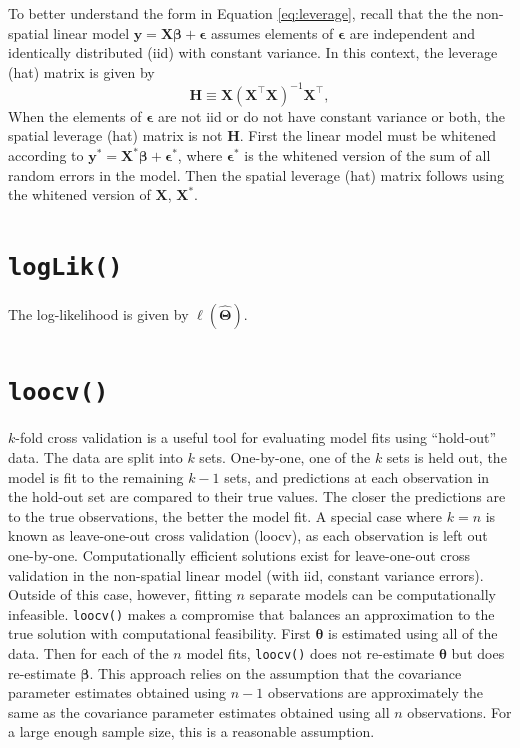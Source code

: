 \documentclass{article}
\begin{document}
To better understand the form in Equation \ref{eq:leverage}, recall that
the the non-spatial linear model
\(\mathbf{y} = \mathbf{X} \boldsymbol{\beta} + \boldsymbol{\epsilon}\)
assumes elements of \(\boldsymbol{\epsilon}\) are independent and
identically distributed (iid) with constant variance. In this context,
the leverage (hat) matrix is given by \begin{equation*}
\mathbf{H} \equiv \mathbf{X} (\mathbf{X}^{\top} \mathbf{X})^{-1} \mathbf{X}^{\top},
\end{equation*} When the elements of \(\boldsymbol{\epsilon}\) are not
iid or do not have constant variance or both, the spatial leverage (hat)
matrix is not \(\mathbf{H}\). First the linear model must be whitened
according to
\(\mathbf{y}^* = \mathbf{X}^* \boldsymbol{\beta} + \boldsymbol{\epsilon}^*\),
where \(\boldsymbol{\epsilon}^*\) is the whitened version of the sum of
all random errors in the model. Then the spatial leverage (hat) matrix
follows using the whitened version of \(\mathbf{X}\), \(\mathbf{X}^*\).

\hypertarget{sec:loglik}{%
\section{\texorpdfstring{\texttt{logLik()}}{logLik()}}\label{sec:loglik}}

The log-likelihood is given by \(\ell(\boldsymbol{\hat{\Theta}})\).

\hypertarget{sec:loocv}{%
\section{\texorpdfstring{\texttt{loocv()}}{loocv()}}\label{sec:loocv}}

\(k\)-fold cross validation is a useful tool for evaluating model fits
using ``hold-out'' data. The data are split into \(k\) sets. One-by-one,
one of the \(k\) sets is held out, the model is fit to the remaining
\(k - 1\) sets, and predictions at each observation in the hold-out set
are compared to their true values. The closer the predictions are to the
true observations, the better the model fit. A special case where
\(k = n\) is known as leave-one-out cross validation (loocv), as each
observation is left out one-by-one. Computationally efficient solutions
exist for leave-one-out cross validation in the non-spatial linear model
(with iid, constant variance errors). Outside of this case, however,
fitting \(n\) separate models can be computationally infeasible.
\texttt{loocv()} makes a compromise that balances an approximation to
the true solution with computational feasibility. First
\(\boldsymbol{\theta}\) is estimated using all of the data. Then for
each of the \(n\) model fits, \texttt{loocv()} does not re-estimate
\(\boldsymbol{\theta}\) but does re-estimate \(\boldsymbol{\beta}\).
This approach relies on the assumption that the covariance parameter
estimates obtained using \(n - 1\) observations are approximately the
same as the covariance parameter estimates obtained using all \(n\)
observations. For a large enough sample size, this is a reasonable
assumption.
\end{document}
